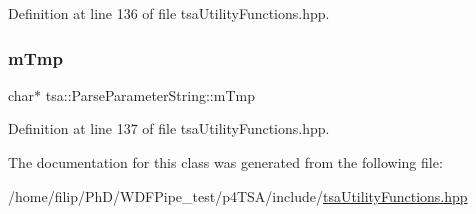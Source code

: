 Definition at line 136 of file tsa\+Utility\+Functions.\+hpp.

\mbox{\label{classtsa_1_1_parse_parameter_string_a3632dcdadae1f3578194c9ba14d4b7c8}} 
\subsubsection{\texorpdfstring{m\+Tmp}{mTmp}}
{\footnotesize\ttfamily char$\ast$ tsa\+::\+Parse\+Parameter\+String\+::m\+Tmp\hspace{0.3cm}{\ttfamily [private]}}



Definition at line 137 of file tsa\+Utility\+Functions.\+hpp.



The documentation for this class was generated from the following file\+:\begin{DoxyCompactItemize}
\item 
/home/filip/\+Ph\+D/\+W\+D\+F\+Pipe\+\_\+test/p4\+T\+S\+A/include/\hyperlink{tsa_utility_functions_8hpp}{tsa\+Utility\+Functions.\+hpp}\end{DoxyCompactItemize}
